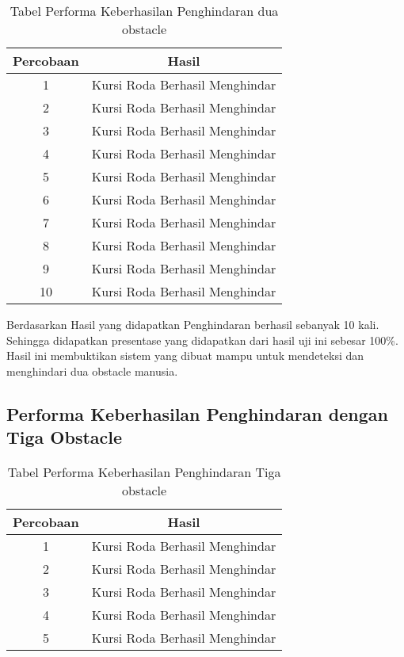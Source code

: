 \begin{table}[H]
    \centering
    \caption{Tabel Performa Keberhasilan Penghindaran dua obstacle}
    \label{tb:mantapkali}
    \begin{tabular}{|c|c|}
    \hline
    Percobaan & Hasil                                                  \\ \hline
    1         & \cellcolor[HTML]{9AFF99}Kursi Roda Berhasil Menghindar \\ \hline
    2         & \cellcolor[HTML]{9AFF99}Kursi Roda Berhasil Menghindar \\ \hline
    3         & \cellcolor[HTML]{9AFF99}Kursi Roda Berhasil Menghindar \\ \hline
    4         & \cellcolor[HTML]{9AFF99}Kursi Roda Berhasil Menghindar \\ \hline
    5         & \cellcolor[HTML]{9AFF99}Kursi Roda Berhasil Menghindar \\ \hline
    6         & \cellcolor[HTML]{9AFF99}Kursi Roda Berhasil Menghindar \\ \hline
    7         & \cellcolor[HTML]{9AFF99}Kursi Roda Berhasil Menghindar \\ \hline
    8         & \cellcolor[HTML]{9AFF99}Kursi Roda Berhasil Menghindar \\ \hline
    9         & \cellcolor[HTML]{9AFF99}Kursi Roda Berhasil Menghindar \\ \hline
    10         & \cellcolor[HTML]{9AFF99}Kursi Roda Berhasil Menghindar \\ \hline
    \end{tabular}
    \end{table}

Berdasarkan Hasil yang didapatkan Penghindaran berhasil sebanyak 10 kali. Sehingga didapatkan presentase yang didapatkan dari hasil uji ini sebesar 100\%. Hasil ini membuktikan sistem yang dibuat mampu untuk mendeteksi dan menghindari dua obstacle manusia.

\subsection{Performa Keberhasilan Penghindaran dengan Tiga Obstacle}
\begin{table}[H]
    \centering
    \caption{Tabel Performa Keberhasilan Penghindaran Tiga obstacle}
    \label{tb:mantapkali2}
    \begin{tabular}{|c|c|}
    \hline
    Percobaan & Hasil                                                  \\ \hline
    1         & \cellcolor[HTML]{9AFF99}Kursi Roda Berhasil Menghindar \\ \hline
    2         & \cellcolor[HTML]{9AFF99}Kursi Roda Berhasil Menghindar \\ \hline
    3         & \cellcolor[HTML]{9AFF99}Kursi Roda Berhasil Menghindar \\ \hline
    4         & \cellcolor[HTML]{9AFF99}Kursi Roda Berhasil Menghindar \\ \hline
    5         & \cellcolor[HTML]{9AFF99}Kursi Roda Berhasil Menghindar \\ \hline
    \end{tabular}
    \end{table}

